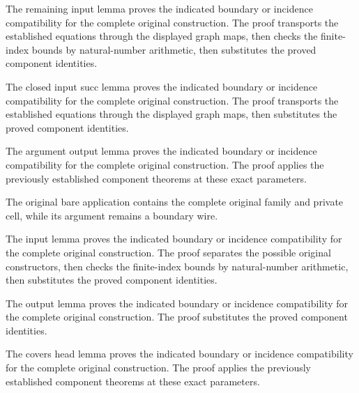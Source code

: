 The remaining input lemma proves the indicated boundary or incidence compatibility for the complete original construction.
The proof transports the established equations through the displayed graph maps, then checks the finite-index bounds by natural-number arithmetic, then substitutes the proved component identities.
\par{}

The closed input succ lemma proves the indicated boundary or incidence compatibility for the complete original construction.
The proof transports the established equations through the displayed graph maps, then substitutes the proved component identities.
\par{}

The argument output lemma proves the indicated boundary or incidence compatibility for the complete original construction.
The proof applies the previously established component theorems at these exact parameters.
\par{}

The original bare application contains the complete original family and
private cell, while its argument remains a boundary wire.
\par{}

The input lemma proves the indicated boundary or incidence compatibility for the complete original construction.
The proof separates the possible original constructors, then checks the finite-index bounds by natural-number arithmetic, then substitutes the proved component identities.
\par{}

The output lemma proves the indicated boundary or incidence compatibility for the complete original construction.
The proof substitutes the proved component identities.
\par{}

The covers head lemma proves the indicated boundary or incidence compatibility for the complete original construction.
The proof applies the previously established component theorems at these exact parameters.
\par{}

